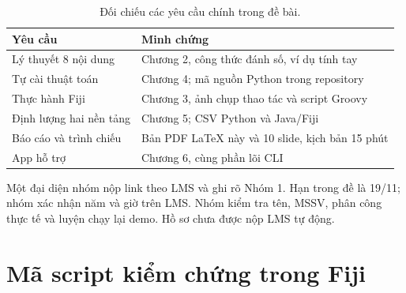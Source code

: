 \documentclass[12pt,a4paper,oneside]{report}
\begin{document}
\begin{table}[H]\centering\small
\caption{Đối chiếu các yêu cầu chính trong đề bài.}\label{tab:requirements}
\begin{tabularx}{\linewidth}{X X}
\toprule
\textbf{Yêu cầu} & \textbf{Minh chứng} \\ \midrule
Lý thuyết 8 nội dung & Chương 2, công thức đánh số, ví dụ tính tay \\
Tự cài thuật toán & Chương 4; mã nguồn Python trong repository \\
Thực hành Fiji & Chương 3, ảnh chụp thao tác và script Groovy \\
Định lượng hai nền tảng & Chương 5; CSV Python và Java/Fiji \\
Báo cáo và trình chiếu & Bản PDF LaTeX này và 10 slide, kịch bản 15 phút \\
App hỗ trợ & Chương 6, cùng phần lõi CLI \\
\bottomrule\end{tabularx}\end{table}
Một đại diện nhóm nộp link theo LMS và ghi rõ Nhóm 1. Hạn trong đề là 19/11; nhóm xác nhận năm và giờ trên LMS. Nhóm kiểm tra tên, MSSV, phân công thực tế và luyện chạy lại demo. Hồ sơ chưa được nộp LMS tự động.
\section{Mã script kiểm chứng trong Fiji}

\end{document}
